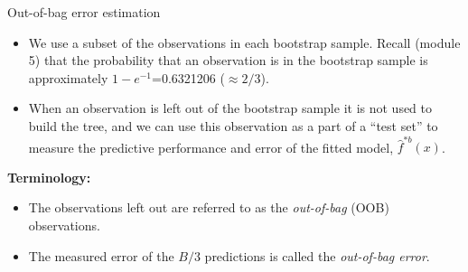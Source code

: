 \documentclass[10pt,ignorenonframetext,]{beamer}
\begin{document}
\begin{frame}

\begin{block}{Out-of-bag error estimation}

\vspace{1mm}

\begin{itemize}
\item
  We use a subset of the observations in each bootstrap sample. Recall
  (module 5) that the probability that an observation is in the
  bootstrap sample is approximately \(1-e^{-1}\)=0.6321206
  (\(\approx 2/3\)).
\item
  When an observation is left out of the bootstrap sample it is not used
  to build the tree, and we can use this observation as a part of a
  ``test set'' to measure the predictive performance and error of the
  fitted model, \(\hat{f}^{*b}(x)\).
\end{itemize}

\vspace{2mm}

\textbf{Terminology:}

\begin{itemize}
\item
  The observations left out are referred to as the \emph{out-of-bag}
  (OOB) observations.
\item
  The measured error of the \(B/3\) predictions is called the
  \emph{out-of-bag error}.
\end{itemize}

\end{block}

\end{frame}
\end{document}

